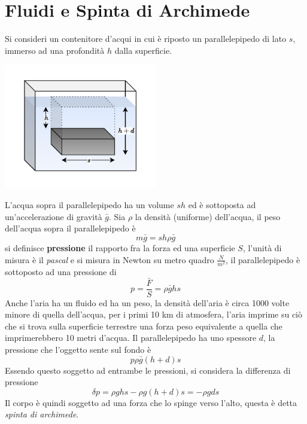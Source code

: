 \documentclass[10pt, letterpaper]{report}
\begin{document}
\section{Fluidi e Spinta di Archimede}
Si consideri un contenitore d'acqui in cui è riposto un parallelepipedo di lato $s$, immerso ad una profondità $h$ dalla superficie.\begin{center}
    \includegraphics[width=0.5\textwidth ]{images/acqua.pdf}
\end{center}
L'acqua sopra il parallelepipedo ha un volume $sh$ ed è sottoposta ad un'accelerazione di gravità $\bar g$. Sia $\rho$ la densità (uniforme) dell'acqua, il peso dell'acqua sopra il parallelepipedo è 
$$ m\bar g = sh\rho \bar g$$
si definisce \textbf{pressione} il rapporto fra la forza ed una superficie $S$, l'unità di misura è il \textit{pascal} e si misura in Newton su metro quadro $\frac{N}{m^2}$, il parallelepipedo è sottoposto ad una pressione di 
$$ p=\frac{\bar F}{S}=\rho \bar g h s$$
Anche l'aria ha un fluido ed ha un peso, la densità dell'aria è circa 1000 volte minore di quella dell'acqua, per i primi 10 km di atmosfera, l'aria imprime su ciò che si trova sulla superficie terrestre una forza peso equivalente a quella che imprimerebbero 10 metri d'acqua.\acc 
Il parallelepipedo ha uno spessore $d$, la pressione che l'oggetto sente sul fondo è 
$$ p\rho \bar g (h+d)s$$
Essendo questo soggetto ad entrambe le pressioni, si considera la differenza di pressione 
$$ \delta p = \rho ghs-\rho g(h+d)s=-\rho gds$$
Il corpo è quindi soggetto ad una forza che lo spinge verso l'alto, questa è detta \textit{spinta di archimede}.
\end{document}
